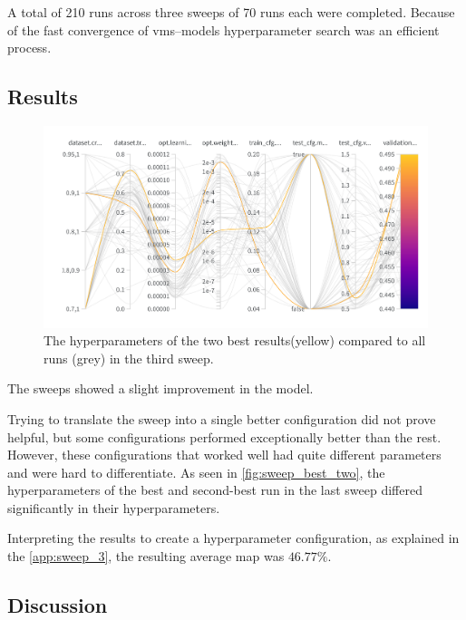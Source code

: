 A total of 210 runs across three sweeps of 70 runs each were completed. Because of the fast convergence of \acrshort{vms}--models hyperparameter search was an efficient process. 


\subsection{Results}
\label{ssec:ex4_results}

\begin{figure}[ht]
    \centering
    \includegraphics[width=1\linewidth]{figures/sweep_two_best.png}
    \caption{The hyperparameters of the two best results(yellow) compared to all runs (grey) in the third sweep. }
    \label{fig:sweep_best_two}
\end{figure}

The sweeps showed a slight improvement in the model. 

Trying to translate the sweep into a single better configuration did not prove helpful, but some configurations performed exceptionally better than the rest. However, these configurations that worked well had quite different parameters and were hard to differentiate. As seen in \autoref{fig:sweep_best_two}, the hyperparameters of the best and second-best run in the last sweep differed significantly in their hyperparameters. 

Interpreting the results to create a hyperparameter configuration, as explained in the \autoref{app:sweep_3}, the resulting average \acrshort{map} was \(46.77\%\). 

\subsection{Discussion}
\label{ssec:ex4_discussion}


